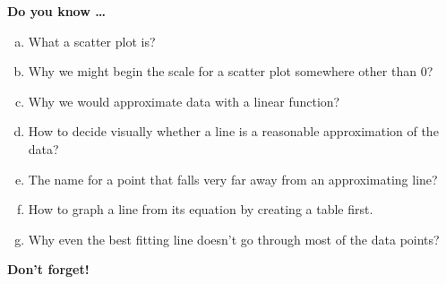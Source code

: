 \newpage



\bigskip

\noindent \textbf{Do you know \ldots} %

\begin{enumerate} [(a)]
\item What a scatter plot is? 
\item Why we might begin the scale for a scatter plot somewhere other than 0?
\item Why we would approximate data with a linear function? 
\item How to decide visually whether a line is a reasonable approximation of the data? 
\item The name for a point that falls very far away from an approximating line? 
\item How to graph a line from its equation by creating a table first.
\item Why even the best fitting line doesn't go through most of the data points?
\end{enumerate}

\bigskip

\noindent \textbf{Don't forget!}
